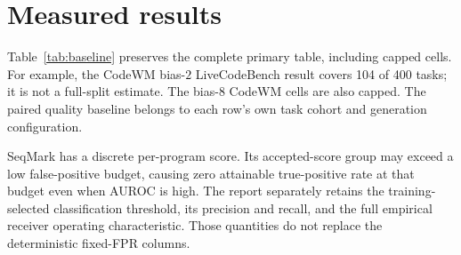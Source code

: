 \documentclass[11pt]{article}
\begin{document}
\section{Measured results}

Table~\ref{tab:baseline} preserves the complete primary table, including
capped cells. For example, the CodeWM bias-$2$ LiveCodeBench result covers
104 of 400 tasks; it is not a full-split estimate. The bias-$8$ CodeWM cells
are also capped. The paired quality baseline belongs to each row's own task
cohort and generation configuration.

SeqMark has a discrete per-program score. Its accepted-score group may exceed
a low false-positive budget, causing zero attainable true-positive rate at
that budget even when AUROC is high. The report separately retains the
training-selected classification threshold, its precision and recall, and
the full empirical receiver operating characteristic. Those quantities do
not replace the deterministic fixed-FPR columns.
\end{document}
